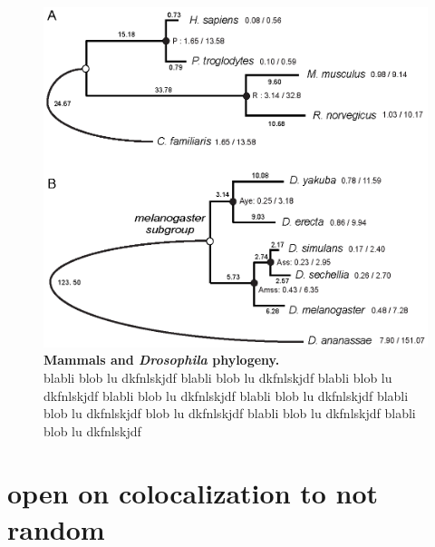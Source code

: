 \begin{figure}[htpb] 
\centering 
\includegraphics[width=\textwidth]{tex_source/figures/gssa/phylogenies.png}
\caption[Mammals and \textit{Drosophila} phylogeny]{{\bf Mammals and
  \textit{Drosophila} phylogeny.} \\blabli blob lu dkfnlskjdf blabli blob lu dkfnlskjdf blabli blob lu dkfnlskjdf blabli blob lu dkfnlskjdf blabli blob lu dkfnlskjdf blabli blob lu dkfnlskjdf  blob lu dkfnlskjdf blabli blob lu dkfnlskjdf blabli blob lu dkfnlskjdf} 
\label{fig:phylogeny}
\end{figure}


\section{open on colocalization to not random}

